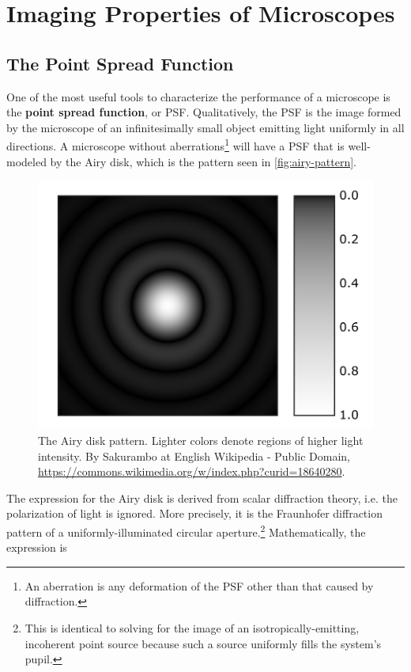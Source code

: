 \documentclass[10pt,a4paper,oneside]{book}
\begin{document}
\section{Imaging Properties of Microscopes}

\subsection{The Point Spread Function} \label{sec:psf}

One of the most useful tools to characterize the performance of a microscope is the \textbf{point spread function}, or PSF. Qualitatively, the PSF is the image formed by the microscope of an infinitesimally small object emitting light uniformly in all directions. A microscope without aberrations\footnote{An aberration is any deformation of the PSF other than that caused by diffraction.} will have a PSF that is well-modeled by the Airy disk, which is the pattern seen in \autoref{fig:airy-pattern}.

\begin{figure}[ht]
    \centering
    \includegraphics{Airy-pattern.png}
    \caption{The Airy disk pattern. Lighter colors denote regions of higher light intensity. By Sakurambo at English Wikipedia - Public Domain, \url{https://commons.wikimedia.org/w/index.php?curid=18640280}.}
    \label{fig:airy-pattern}
\end{figure}

The expression for the Airy disk is derived from scalar diffraction theory, i.e. the polarization of light is ignored. More precisely, it is the Fraunhofer diffraction pattern of a uniformly-illuminated circular aperture.\footnote{This is identical to solving for the image of an isotropically-emitting, incoherent point source because such a source uniformly fills the system's pupil.} Mathematically, the expression is
\end{document}
